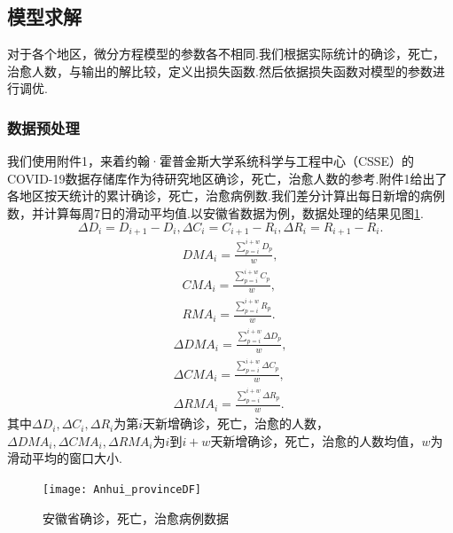 \documentclass{whutmod}
\begin{document}
\subsection{模型求解}
对于各个地区，微分方程模型的参数各不相同.我们根据实际统计的确诊，死亡，治愈人数，与输出的解比较，定义出损失函数.然后依据损失函数对模型的参数进行调优.
	\subsubsection{数据预处理}
	我们使用附件1，来着约翰·霍普金斯大学系统科学与工程中心（CSSE）的COVID-19数据存储库作为待研究地区确诊，死亡，治愈人数的参考.附件1给出了各地区按天统计的累计确诊，死亡，治愈病例数.我们差分计算出每日新增的病例数，并计算每周7日的滑动平均值.以安徽省数据为例，数据处理的结果见图\ref{fig:Anhui_provinceDF}.
	\begin{equation}
		\Delta D_i = D_{i+1}-D_i,
		\Delta C_i = C_{i+1}-R_i,
		\Delta R_i = R_{i+1}-R_i.
	\end{equation}
	\begin{equation}
		\begin{aligned}
		DMA_i = \frac{\sum_{p=i}^{i+w} D_{p}}{w},\\
		CMA_i = \frac{\sum_{p=i}^{i+w} C_{p}}{w},\\
		RMA_i = \frac{\sum_{p=i}^{i+w} R_{p}}{w}.
		\end{aligned}
	\end{equation}
	\begin{equation}
		\begin{aligned}
		\Delta DMA_i = \frac{\sum_{p=i}^{i+w} \Delta D_{p}}{w},\\
		\Delta CMA_i = \frac{\sum_{p=i}^{i+w} \Delta C_{p}}{w},\\
		\Delta RMA_i = \frac{\sum_{p=i}^{i+w} \Delta R_{p}}{w}.
		\end{aligned}
	\end{equation}
	其中$\Delta D_i,\Delta C_i,\Delta R_i$为第$i$天新增确诊，死亡，治愈的人数，$\Delta DMA_i,\Delta CMA_i,\Delta RMA_i$为$i$到$i+w$天新增确诊，死亡，治愈的人数均值，$w$为滑动平均的窗口大小.
	\begin{figure}[!h]
		\centering
		\texttt{[image: Anhui\_provinceDF]}
		\caption{安徽省确诊，死亡，治愈病例数据}
		\label{fig:Anhui_provinceDF}
	\end{figure}
\end{document}
